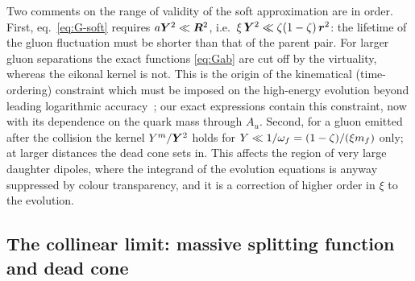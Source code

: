 Two comments on the range of validity of the soft approximation are in order. First,
eq.~\eqref{eq:G-soft} requires $a\bm{Y}^2\ll\bm{R}^2$, i.e.\ $\xi\,\bm{Y}^2\ll\zeta(1-\zeta)\,\bm r^2$: the lifetime of
the gluon fluctuation must be shorter than that of the parent pair. For larger gluon separations the
exact functions \eqref{eq:Gab} are cut off by the virtuality, whereas the eikonal kernel is not. This is
the origin of the kinematical (time-ordering) constraint which must be imposed on the high-energy
evolution beyond leading logarithmic
accuracy~\cite{Beuf:2014uia,Iancu:2015vea,Ducloue:2019ezk}; our exact expressions contain this
constraint, now with its dependence on the quark mass through $A_u$. Second, for a gluon emitted after
the collision the kernel $Y^m/\bm{Y}^2$ holds for $Y\ll1/\omega_f=(1-\zeta)/(\xi m_f)$ only; at larger
distances the dead cone sets in. This affects the region of very large daughter dipoles, where the
integrand of the evolution equations is anyway suppressed by colour transparency, and it is a
correction of higher order in $\xi$ to the evolution.

\subsection{The collinear limit: massive splitting function and dead cone}
\label{sec:coll}

